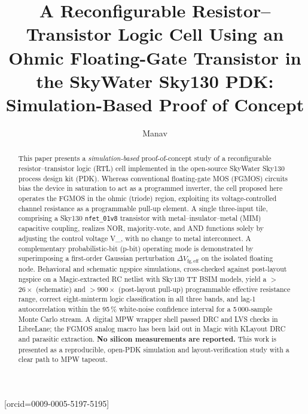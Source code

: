 \documentclass[a4paper,fleqn]{cas-sc}
\newcommand{\Vfgeff}{V_{\mathrm{fg,eff}}}
\newcommand{\Vctrl}{V_{\mathrm{ctrl}}}
\begin{document}
\let\WriteBookmarks\relax


\title[mode=title]{%
  A Reconfigurable Resistor--Transistor Logic Cell Using an Ohmic
  Floating-Gate Transistor in the SkyWater Sky130 PDK:
  Simulation-Based Proof of Concept}

\author[1]{Manav}[orcid=0009-0005-5197-5195]
\cormark[1]



\begin{abstract}
This paper presents a \emph{simulation-based} proof-of-concept study of a
reconfigurable resistor--transistor logic (RTL) cell implemented in the open-source
SkyWater Sky130 process design kit (PDK). Whereas conventional floating-gate MOS
(FGMOS) circuits bias the device in saturation to act as a programmed inverter, the
cell proposed here operates the FGMOS in the ohmic (triode) region, exploiting its
voltage-controlled channel resistance as a programmable pull-up element. A single
three-input tile, comprising a Sky130 \texttt{nfet\_01v8} transistor with
metal--insulator--metal (MIM) capacitive coupling, realizes NOR, majority-vote, and
AND functions solely by adjusting the control voltage \Vctrl, with no change to metal
interconnect. A complementary probabilistic-bit (p-bit) operating mode is demonstrated
by superimposing a first-order Gaussian perturbation $\Delta\Vfgeff$ on the isolated
floating node. Behavioral and schematic ngspice simulations, cross-checked against
post-layout ngspice on a Magic-extracted RC netlist with Sky130 TT BSIM models,
yield a $>$$26\times$ (schematic) and $>$$900\times$ (post-layout pull-up)
programmable effective resistance range, correct eight-minterm logic
classification in all three bands, and lag-1 autocorrelation within the 95\,\%
white-noise confidence interval for a 5\,000-sample Monte Carlo stream. A digital
MPW wrapper shell passed DRC and LVS checks in LibreLane; the FGMOS analog macro
has been laid out in Magic with KLayout DRC and parasitic extraction.
\textbf{No silicon measurements are reported.} This work is presented as a
reproducible, open-PDK simulation and layout-verification study with a clear path
to MPW tapeout.
\end{abstract}
\end{document}
